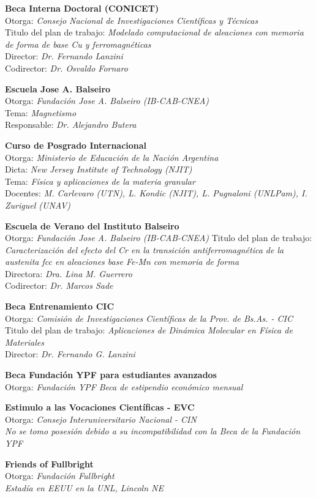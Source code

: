 \textbf{Beca Interna Doctoral (CONICET)}\\
Otorga: \textit{Consejo Nacional de Investigaciones Científicas y Técnicas}\\
Titulo del plan de trabajo: \textit{Modelado computacional de aleaciones con memoria de forma de base Cu y ferromagnéticas}\\ 
Director: \textit{Dr. Fernando Lanzini}\\
Codirector: \textit{Dr. Osvaldo Fornaro}

\textbf{Escuela Jose A. Balseiro}\\
Otorga: \textit{Fundación Jose A. Balseiro (IB-CAB-CNEA)}\\
Tema: \textit{Magnetismo}\\
Responsable: \textit{Dr. Alejandro Butera}

\textbf{Curso de Posgrado Internacional}\\
Otorga: \textit{Ministerio de Educación de la Nación Argentina}\\
Dicta: \textit{New Jersey Institute of Technology (NJIT)}\\
Tema: \textit{Física y aplicaciones de la materia granular}\\
Docentes: \textit{M. Carlevaro (UTN), L. Kondic (NJIT), L. Pugnaloni (UNLPam), I. Zuriguel (UNAV)}

\textbf{Escuela de Verano del Instituto Balseiro}\\
Otorga: \textit{Fundación Jose A. Balseiro (IB-CAB-CNEA)}
Titulo del plan de trabajo: \textit{Caracterización del efecto del Cr en la transición antiferromagnética de la austenita fcc en aleaciones base Fe-Mn con memoria de forma}\\
Directora: \textit{Dra. Lina M. Guerrero}\\ 
Codirector: \textit{Dr. Marcos Sade}

\textbf{Beca Entrenamiento CIC}\\
Otorga: \textit{Comisión de Investigaciones Científicas de la Prov. de Bs.As. - CIC}\\
Titulo del plan de trabajo: \textit{Aplicaciones de Dinámica Molecular en Física de Materiales}\\ 
Director: \textit{Dr. Fernando G. Lanzini}

\textbf{Beca Fundación YPF para estudiantes avanzados}\\
Otorga: \textit{Fundación YPF}
\textit{Beca de estipendio económico mensual}

\textbf{Estimulo a las Vocaciones Científicas - EVC}\\
Otorga: \textit{Consejo Interuniversitario Nacional - CIN}\\
\textit{No se tomo posesión debido a su incompatibilidad con la Beca de la Fundación YPF}

\textbf{Friends of Fullbright}\\
Otorga: \textit{Fundación Fullbright}\\
\textit{Estadía en EEUU en la UNL, Lincoln NE}